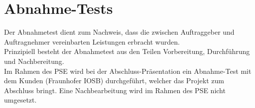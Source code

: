 \section{Abnahme-Tests}
Der Abnahmetest dient zum Nachweis, dass die zwischen Auftraggeber und Auftragnehmer vereinbarten Leistungen erbracht wurden. \\
Prinzipiell besteht der Abnahmetest aus den Teilen Vorbereitung, Durchführung und Nachbereitung. \\
Im Rahmen des PSE wird bei der Abschluss-Präsentation ein Abnahme-Test mit dem Kunden (Fraunhofer IOSB) durchgeführt, welcher das Projekt zum Abschluss bringt. Eine Nachbearbeitung wird im Rahmen des PSE nicht umgesetzt.